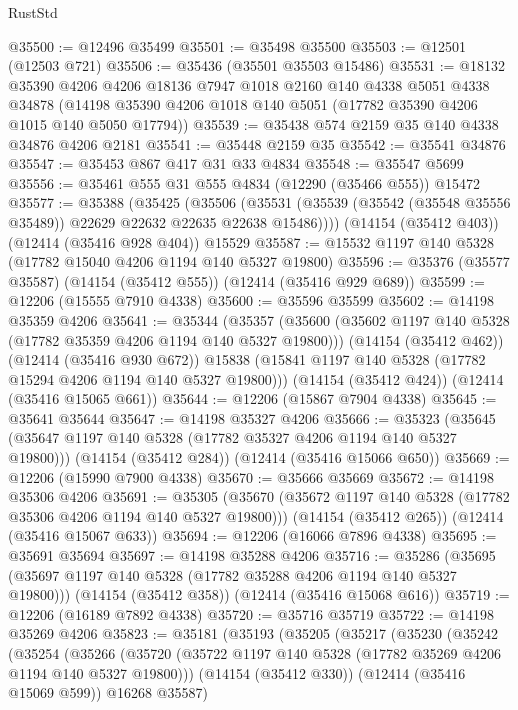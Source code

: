 \begin{lexlean}{RustStd}
\begin{coremodule}
{\begin{coremodule}
{{{{{{{{{{{{{{{{{{{{{{{{{{{{{{{{{{{{{{{{{{{{{{{{{{@35500 := @12496 @35499
@35501 := @35498 @35500
@35503 := @12501 (@12503 @721)
@35506 := @35436 (@35501 @35503 @15486)
@35531 := @18132
    @35390
    @4206
    @4206
    @18136
    @7947
    @1018
    @2160
    @140
    @4338
    @5051
    @4338
    @34878
    (@14198 @35390 @4206 @1018 @140 @5051 (@17782 @35390 @4206 @1015 @140 @5050 @17794))
@35539 := @35438 @574 @2159 @35 @140 @4338 @34876 @4206 @2181
@35541 := @35448 @2159 @35
@35542 := @35541 @34876
@35547 := @35453 @867 @417 @31 @33 @4834
@35548 := @35547 @5699
@35556 := @35461 @555 @31 @555 @4834 (@12290 (@35466 @555)) @15472
@35577 := @35388
    (@35425
      (@35506 (@35531 (@35539 (@35542 (@35548 @35556 @35489)) @22629 @22632 @22635 @22638 @15486))))
    (@14154 (@35412 @403))
    (@12414 (@35416 @928 @404))
    @15529
@35587 := @15532 @1197 @140 @5328 (@17782 @15040 @4206 @1194 @140 @5327 @19800)
@35596 := @35376 (@35577 @35587) (@14154 (@35412 @555)) (@12414 (@35416 @929 @689))
@35599 := @12206 (@15555 @7910 @4338)
@35600 := @35596 @35599
@35602 := @14198 @35359 @4206
@35641 := @35344
    (@35357
      (@35600 (@35602 @1197 @140 @5328 (@17782 @35359 @4206 @1194 @140 @5327 @19800)))
      (@14154 (@35412 @462))
      (@12414 (@35416 @930 @672))
      @15838
      (@15841 @1197 @140 @5328 (@17782 @15294 @4206 @1194 @140 @5327 @19800)))
    (@14154 (@35412 @424))
    (@12414 (@35416 @15065 @661))
@35644 := @12206 (@15867 @7904 @4338)
@35645 := @35641 @35644
@35647 := @14198 @35327 @4206
@35666 := @35323
    (@35645 (@35647 @1197 @140 @5328 (@17782 @35327 @4206 @1194 @140 @5327 @19800)))
    (@14154 (@35412 @284))
    (@12414 (@35416 @15066 @650))
@35669 := @12206 (@15990 @7900 @4338)
@35670 := @35666 @35669
@35672 := @14198 @35306 @4206
@35691 := @35305
    (@35670 (@35672 @1197 @140 @5328 (@17782 @35306 @4206 @1194 @140 @5327 @19800)))
    (@14154 (@35412 @265))
    (@12414 (@35416 @15067 @633))
@35694 := @12206 (@16066 @7896 @4338)
@35695 := @35691 @35694
@35697 := @14198 @35288 @4206
@35716 := @35286
    (@35695 (@35697 @1197 @140 @5328 (@17782 @35288 @4206 @1194 @140 @5327 @19800)))
    (@14154 (@35412 @358))
    (@12414 (@35416 @15068 @616))
@35719 := @12206 (@16189 @7892 @4338)
@35720 := @35716 @35719
@35722 := @14198 @35269 @4206
@35823 := @35181
    (@35193
      (@35205
        (@35217
          (@35230
            (@35242
              (@35254
                (@35266
                  (@35720 (@35722 @1197 @140 @5328 (@17782 @35269 @4206 @1194 @140 @5327 @19800)))
                  (@14154 (@35412 @330))
                  (@12414 (@35416 @15069 @599))
                  @16268
                  @35587)
}}}}}}}}}}}}}}}}}}}}}}}}}}}}}}}}}}}}}}}}}}}}}}}}}}
\end{coremodule}}
\end{coremodule}
\end{lexlean}

